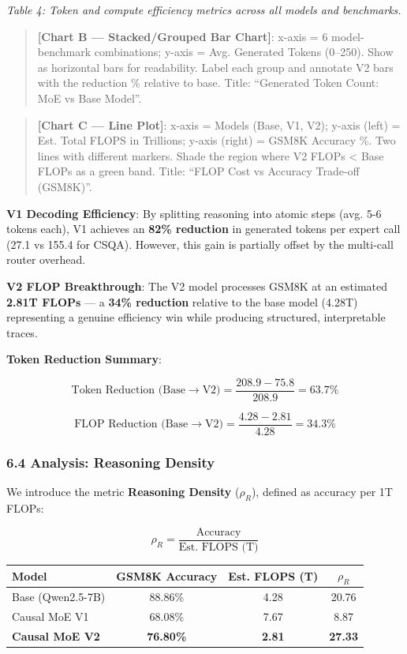 \emph{Table 4: Token and compute efficiency metrics across all models
and benchmarks.}

\begin{quote}
\textbf{{[}Chart B --- Stacked/Grouped Bar Chart{]}}: x-axis = 6
model-benchmark combinations; y-axis = Avg. Generated Tokens (0--250).
Show as horizontal bars for readability. Label each group and annotate
V2 bars with the reduction \% relative to base. Title: ``Generated Token
Count: MoE vs Base Model''.
\end{quote}

\begin{quote}
\textbf{{[}Chart C --- Line Plot{]}}: x-axis = Models (Base, V1, V2);
y-axis (left) = Est. Total FLOPS in Trillions; y-axis (right) = GSM8K
Accuracy \%. Two lines with different markers. Shade the region where V2
FLOPs \textless{} Base FLOPs as a green band. Title: ``FLOP Cost vs
Accuracy Trade-off (GSM8K)''.
\end{quote}

\textbf{V1 Decoding Efficiency}: By splitting reasoning into atomic
steps (avg. 5-6 tokens each), V1 achieves an \textbf{82\% reduction} in
generated tokens per expert call (27.1 vs 155.4 for CSQA). However, this
gain is partially offset by the multi-call router overhead.

\textbf{V2 FLOP Breakthrough}: The V2 model processes GSM8K at an
estimated \textbf{2.81T FLOPs} --- a \textbf{34\% reduction} relative to
the base model (4.28T) representing a genuine efficiency win while
producing structured, interpretable traces.

\textbf{Token Reduction Summary}:

\[\text{Token Reduction (Base} \to \text{V2)} = \frac{208.9 - 75.8}{208.9} = \boxed{63.7\%}\]

\[\text{FLOP Reduction (Base} \to \text{V2)} = \frac{4.28 - 2.81}{4.28} = \boxed{34.3\%}\]

\subsubsection{6.4 Analysis: Reasoning
Density}\label{analysis-reasoning-density}

We introduce the metric \textbf{Reasoning Density} (\(\rho_R\)), defined
as accuracy per 1T FLOPs:

\[\rho_R = \frac{\text{Accuracy}}{\text{Est. FLOPS (T)}}\]

{\def\LTcaptype{none} %
\begin{longtable}[]{@{}lccc@{}}
\toprule\noalign{}
Model & GSM8K Accuracy & Est. FLOPS (T) & \(\rho_R\) \\
\midrule\noalign{}
\endhead
\bottomrule\noalign{}
\endlastfoot
Base (Qwen2.5-7B) & 88.86\% & 4.28 & 20.76 \\
Causal MoE V1 & 68.08\% & 7.67 & 8.87 \\
\textbf{Causal MoE V2} & \textbf{76.80\%} & \textbf{2.81} &
\textbf{27.33} \\
\end{longtable}
}

